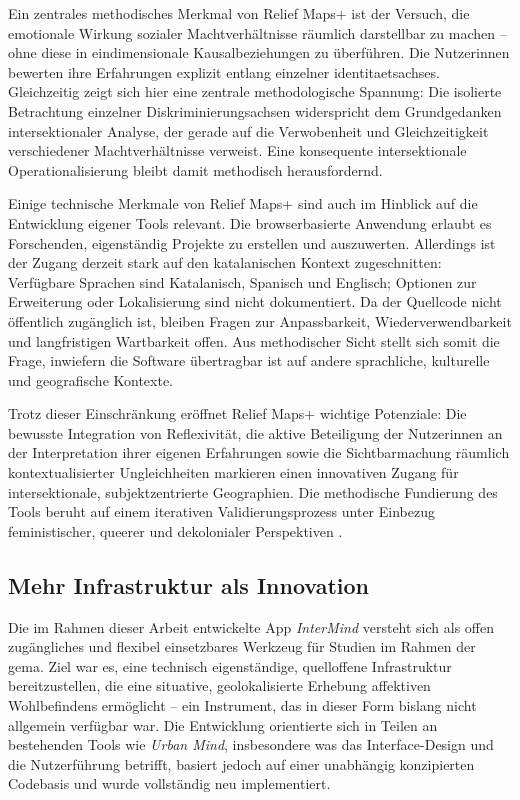Ein zentrales methodisches Merkmal von Relief Maps+ ist der Versuch, die emotionale Wirkung sozialer Machtverhältnisse räumlich darstellbar zu machen – ohne diese in eindimensionale Kausalbeziehungen zu überführen. Die Nutzer\genderstern innen bewerten ihre Erfahrungen explizit entlang einzelner \glspl{identitaetsachse}. Gleichzeitig zeigt sich hier eine zentrale methodologische Spannung: Die isolierte Betrachtung einzelner Diskriminierungsachsen widerspricht dem Grundgedanken intersektionaler Analyse, der gerade auf die Verwobenheit und Gleichzeitigkeit verschiedener Machtverhältnisse verweist. Eine konsequente intersektionale Operationalisierung bleibt damit methodisch herausfordernd.

Einige technische Merkmale von Relief Maps+ sind auch im Hinblick auf die Entwicklung eigener Tools relevant. Die browserbasierte Anwendung erlaubt es Forschenden, eigenständig Projekte zu erstellen und auszuwerten. Allerdings ist der Zugang derzeit stark auf den katalanischen Kontext zugeschnitten: Verfügbare Sprachen sind Katalanisch, Spanisch und Englisch; Optionen zur Erweiterung oder Lokalisierung sind nicht dokumentiert. Da der Quellcode nicht öffentlich zugänglich ist, bleiben Fragen zur Anpassbarkeit, Wiederverwendbarkeit und langfristigen Wartbarkeit offen. Aus methodischer Sicht stellt sich somit die Frage, inwiefern die Software übertragbar ist auf andere sprachliche, kulturelle und geografische Kontexte.

Trotz dieser Einschränkung eröffnet Relief Maps+ wichtige Potenziale: Die bewusste Integration von Reflexivität, die aktive Beteiligung der Nutzer\genderstern innen an der Interpretation ihrer eigenen Erfahrungen sowie die Sichtbarmachung räumlich kontextualisierter Ungleichheiten markieren einen innovativen Zugang für intersektionale, subjektzentrierte Geographien. Die methodische Fundierung des Tools beruht auf einem iterativen Validierungsprozess unter Einbezug feministischer, queerer und dekolonialer Perspektiven \parencite{luizdesouzaSpiralValidationProcess2025}.



\subsection{Mehr Infrastruktur als Innovation}

Die im Rahmen dieser Arbeit entwickelte App \textit{InterMind} versteht sich als offen zugängliches und flexibel einsetzbares Werkzeug für Studien im Rahmen der \acrshort{gema}. Ziel war es, eine technisch eigenständige, quelloffene Infrastruktur bereitzustellen, die eine situative, geolokalisierte Erhebung affektiven Wohlbefindens ermöglicht – ein Instrument, das in dieser Form bislang nicht allgemein verfügbar war. Die Entwicklung orientierte sich in Teilen an bestehenden Tools wie \textit{Urban Mind}, insbesondere was das Interface-Design und die Nutzerführung betrifft, basiert jedoch auf einer unabhängig konzipierten Codebasis und wurde vollständig neu implementiert.

